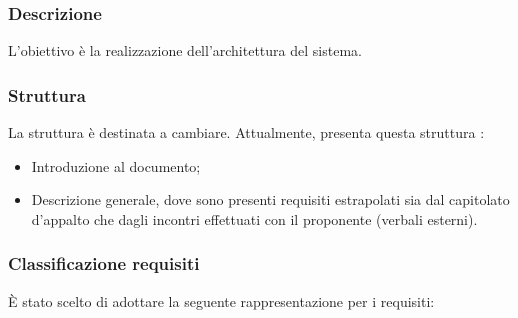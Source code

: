 \subsubsection{Descrizione}
L’obiettivo è la realizzazione dell’architettura del sistema.

\subsubsection{Struttura}
La struttura è destinata a cambiare.
Attualmente, \AdR presenta questa struttura :
\begin{itemize}
  \item Introduzione al documento;
  \item Descrizione generale, dove sono presenti requisiti estrapolati sia dal capitolato d’appalto che dagli incontri effettuati con il proponente (verbali esterni).
\end{itemize}

\subsubsection{Classificazione requisiti}
È stato scelto di adottare la seguente rappresentazione per i requisiti:

